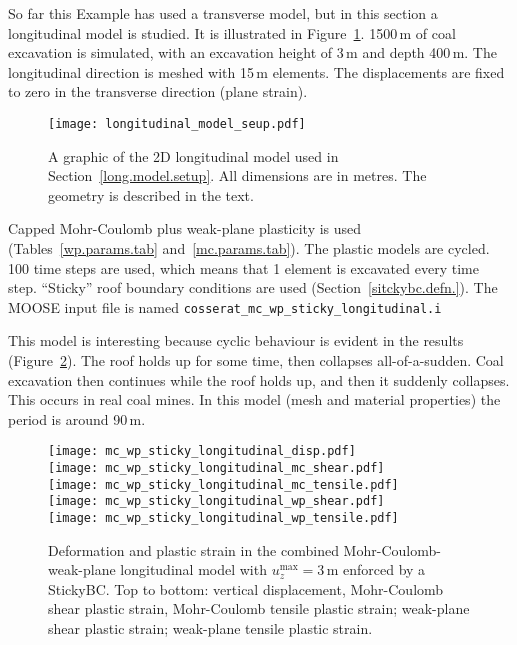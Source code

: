 \documentclass[]{scrreprt}
\begin{document}
So far this Example has used a transverse model, but in this section a
longitudinal model is studied.  It is illustrated in
Figure~\ref{long_model.fig}.  1500\,m of coal excavation is simulated,
with an excavation height of 3\,m and depth 400\,m.  The longitudinal direction is
meshed with 15\,m elements.  The displacements are fixed to zero in
the transverse direction (plane strain).

\begin{figure}[htb]
\begin{center}
\texttt{[image: longitudinal\_model\_seup.pdf]}
\caption{A graphic of the 2D longitudinal model used in Section~\ref{long.model.setup}.  All
  dimensions are in metres.  The geometry is described in the text.}
\label{long_model.fig}
\end{center}
\end{figure}


Capped Mohr-Coulomb plus weak-plane plasticity is used
(Tables~\ref{wp.params.tab} and~\ref{mc.params.tab}).  The plastic
models are cycled.  100 time steps are used, which means that 1
element is excavated every time step.  ``Sticky'' roof boundary
conditions are used (Section~\ref{sitckybc.defn.}).    The MOOSE input file
is named {\tt cosserat\_mc\_wp\_sticky\_longitudinal.i}

This model is interesting because cyclic behaviour is evident in the
results (Figure~\ref{mc_wp_sticky_longitudinal}).  The
roof holds up for some time, then collapses all-of-a-sudden.  Coal
excavation then continues while the roof holds up, and then it
suddenly collapses.  This occurs in real coal mines.  In this model
(mesh and material properties) the period is around
90\,m.


\begin{figure}[p]
\begin{center}
\texttt{[image: mc\_wp\_sticky\_longitudinal\_disp.pdf]} \\
\texttt{[image: mc\_wp\_sticky\_longitudinal\_mc\_shear.pdf]} \\
\texttt{[image: mc\_wp\_sticky\_longitudinal\_mc\_tensile.pdf]} \\
\texttt{[image: mc\_wp\_sticky\_longitudinal\_wp\_shear.pdf]} \\
\texttt{[image: mc\_wp\_sticky\_longitudinal\_wp\_tensile.pdf]}
\caption{Deformation and plastic strain in the combined
  Mohr-Coulomb-weak-plane longitudinal model with
  $u_{z}^{\mathrm{max}} = 3$\,m enforced by a StickyBC.  Top to
  bottom: vertical displacement, Mohr-Coulomb shear plastic strain,
  Mohr-Coulomb tensile plastic strain; weak-plane shear plastic
  strain; weak-plane tensile plastic strain.}
\label{mc_wp_sticky_longitudinal}
\end{center}
\end{figure}
\end{document}
